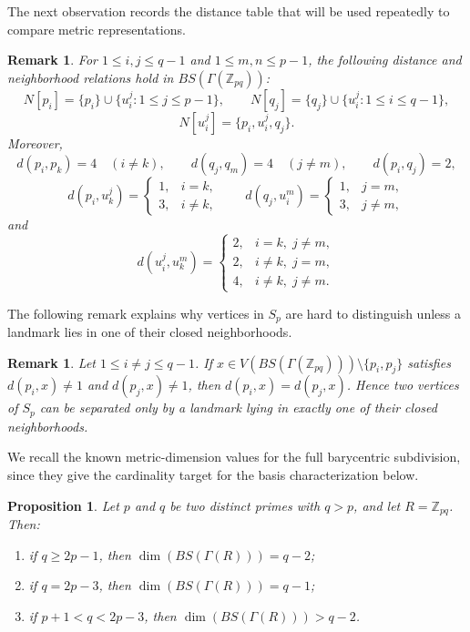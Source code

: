 \documentclass[12pt]{article}
\newtheorem{proposition}[theorem]{Proposition}
\newtheorem{remark}[theorem]{Remark}
\begin{document}
\noindent The next observation records the distance table that will be used repeatedly to compare metric representations.
\begin{remark}\label{remark1}
For $1\leq i,j\leq q-1$ and $1\leq m,n\leq p-1$, the following distance and neighborhood relations hold in $BS(\Gamma(\mathbb Z_{pq}))$:
$$
N[p_i]=\{p_i\}\cup\{u_i^j:1\leq j\leq p-1\},\qquad
N[q_j]=\{q_j\}\cup\{u_i^j:1\leq i\leq q-1\},
$$
$$
N[u_i^j]=\{p_i,u_i^j,q_j\}.
$$
Moreover,
$$
d(p_i,p_k)=4\quad (i\neq k),\qquad d(q_j,q_m)=4\quad (j\neq m),\qquad d(p_i,q_j)=2,
$$
$$
d(p_i,u_k^j)=
\begin{cases}
1, & i=k,\\
3, & i\neq k,
\end{cases}
\qquad
 d(q_j,u_i^m)=
\begin{cases}
1, & j=m,\\
3, & j\neq m,
\end{cases}
$$
and
$$
d(u_i^j,u_k^m)=
\begin{cases}
2, & i=k,\; j\neq m,\\
2, & i\neq k,\; j=m,\\
4, & i\neq k,\; j\neq m.
\end{cases}
$$
\end{remark}

\noindent The following remark explains why vertices in $S_p$ are hard to distinguish unless a landmark lies in one of their closed neighborhoods.
\begin{remark}\label{remar2}
Let $1\leq i\neq j\leq q-1$. If $x\in V(BS(\Gamma(\mathbb Z_{pq})))\setminus\{p_i,p_j\}$ satisfies $d(p_i,x)\neq 1$ and $d(p_j,x)\neq 1$, then $d(p_i,x)=d(p_j,x)$. Hence two vertices of $S_p$ can be separated only by a landmark lying in exactly one of their closed neighborhoods.
\end{remark}

\noindent We recall the known metric-dimension values for the full barycentric subdivision, since they give the cardinality target for the basis characterization below.
\begin{proposition}\rm \cite{77}\label{ET}
Let $p$ and $q$ be two distinct primes with $q>p$, and let $R=\mathbb Z_{pq}$. Then:
\begin{enumerate}[label=$\mathrm{(\arabic*)}$]
\item if $q\geq 2p-1$, then $\dim(BS(\Gamma(R)))=q-2$;
\item if $q=2p-3$, then $\dim(BS(\Gamma(R)))=q-1$;
\item if $p+1<q<2p-3$, then $\dim(BS(\Gamma(R)))>q-2$.
\end{enumerate}
\end{proposition}
\end{document}
